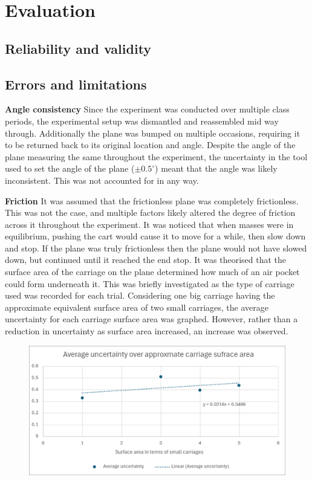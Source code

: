 \documentclass[11pt,a4paper]{article}
\begin{document}
\section{Evaluation}

\subsection{Reliability and validity}

\subsection{Errors and limitations}
\textbf{Angle consistency}\newline
Since the experiment was conducted over multiple class periods, the experimental setup was dismantled and reassembled mid way through. Additionally the plane was bumped on multiple occasions, requiring it to be returned back to its original location and angle. Despite the angle of the plane measuring the same throughout the experiment, the uncertainty in the tool used to set the angle of the plane ($\pm0.5^\circ$) meant that the angle was likely inconsistent. This was not accounted for in any way.

\textbf{Friction}\newline
It was assumed that the frictionless plane was completely frictionless. This was not the case, and multiple factors likely altered the degree of friction across it throughout the experiment. 
It was noticed that when masses were in equilibrium, pushing the cart would cause it to move for a while, then slow down and stop. If the plane was truly frictionless then the plane would not have slowed down, but continued until it reached the end stop. It was theorised that the surface area of the carriage on the plane determined how much of an air pocket could form underneath it. This was briefly investigated as the type of carriage used was recorded for each trial. Considering one big carriage having the approximate equivalent surface area of two small carriages, the average uncertainty for each carriage surface area was graphed. However, rather than a reduction in uncertainty as surface area increased, an increase was observed. 
\begin{figure}
\centering
\includegraphics[width=0.3\paperwidth]{./images/ApproxCarriage.png}

\end{figure}
\end{document}

